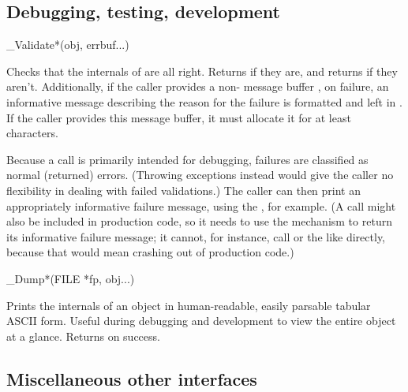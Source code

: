 \subsection{Debugging, testing, development}

\begin{sreapi}
\hypertarget{ifc:Validate}
{\item[\_Validate*(obj, errbuf...)]}

Checks that the internals of  are all right. Returns
 if they are, and returns  if they
aren't. Additionally, if the caller provides a non-
message buffer , on failure, an informative message
describing the reason for the failure is formatted and left in
. If the caller provides this message buffer, it must
allocate it for at least  characters.

Because a  call is primarily intended for
debugging, failures are classified as normal (returned) errors.
(Throwing exceptions instead would give the caller no flexibility in
dealing with failed validations.) The caller can then print an
appropriately informative failure message, using the ,
for example. (A  call might also be included in
production code, so it needs to use the  mechanism to
return its informative failure message; it cannot, for instance, call
 or the like directly, because that would mean
crashing out of production code.)

\hypertarget{ifc:Dump}
{\item[\_Dump*(FILE *fp, obj...)]}

Prints the internals of an object in human-readable, easily parsable
tabular ASCII form. Useful during debugging and development to view
the entire object at a glance. Returns  on success.

\end{sreapi}

\subsection{Miscellaneous other interfaces}

